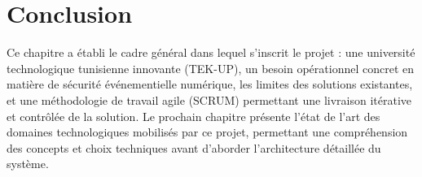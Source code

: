 \section*{Conclusion}
Ce chapitre a établi le cadre général dans lequel s'inscrit le projet : une université technologique tunisienne innovante (TEK-UP), un besoin opérationnel concret en matière de sécurité événementielle numérique, les limites des solutions existantes, et une méthodologie de travail agile (SCRUM) permettant une livraison itérative et contrôlée de la solution. Le prochain chapitre présente l'état de l'art des domaines technologiques mobilisés par ce projet, permettant une compréhension des concepts et choix techniques avant d'aborder l'architecture détaillée du système.

